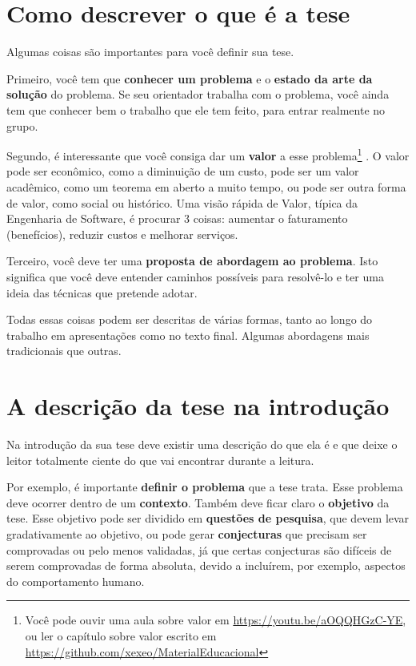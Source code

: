 \section{Como descrever o que é a tese}

Algumas coisas são importantes para você definir sua tese.

Primeiro, você tem que \textbf{conhecer um problema} e o \textbf{estado da arte da solução} do problema. Se seu orientador trabalha com o problema, você ainda tem que conhecer bem o trabalho que ele tem feito, para entrar realmente no grupo.

Segundo, é interessante que você consiga dar um \textbf{valor} a esse problema\footnote{Você pode ouvir uma aula sobre valor em \url{https://youtu.be/aOQQHGzC-YE}, ou ler o capítulo sobre valor escrito em \url{https://github.com/xexeo/MaterialEducacional}} . O valor pode ser econômico, como a diminuição de um custo, pode ser um valor acadêmico, como um teorema em aberto a muito tempo, ou pode ser outra forma de valor, como social ou histórico. Uma visão rápida de Valor, típica da Engenharia de Software, é procurar 3 coisas: aumentar o faturamento (benefícios), reduzir custos e melhorar serviços.

Terceiro, você deve ter uma \textbf{proposta de abordagem ao problema}. Isto significa que você deve entender caminhos possíveis para resolvê-lo e ter uma ideia das técnicas que pretende adotar.

Todas essas coisas podem ser descritas de várias formas, tanto ao longo do trabalho em apresentações como no texto final. Algumas abordagens mais tradicionais que outras.

\section{A descrição da tese na introdução}

Na introdução da sua tese deve existir uma descrição do que ela é e que deixe o leitor totalmente ciente do que vai encontrar durante a leitura.

Por exemplo, é importante \textbf{definir o problema} que a tese trata. Esse problema deve ocorrer dentro de um \textbf{contexto}. Também deve ficar claro o \textbf{objetivo} da tese. Esse objetivo pode ser dividido em \textbf{questões de pesquisa}, que devem levar gradativamente ao objetivo, ou pode gerar \textbf{conjecturas} que precisam ser comprovadas ou pelo menos validadas, já que certas conjecturas são difíceis de serem comprovadas de forma absoluta, devido a incluírem, por exemplo, aspectos do comportamento humano.

